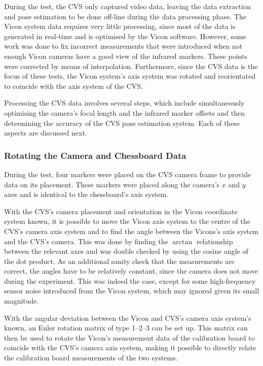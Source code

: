 During the test, the CVS only captured video data, leaving the data extraction and pose estimation to be done off-line during the data processing phase. The Vicon system data requires very little processing, since most of the data is generated in real-time and is optimised by the Vicon software. However, some work was done to fix incorrect measurements that were introduced when not enough Vicon cameras have a good view of the infrared markers. These points were corrected by means of interpolation. Furthermore, since the CVS data is the focus of these tests, the Vicon system's axis system was rotated and reorientated to coincide with the axis system of the CVS.

Processing the CVS data involves several steps, which include simultaneously optimising the camera's focal length and the infrared marker offsets and then determining the accuracy of the CVS pose estimation system. Each of these aspects are discussed next.

\subsubsection{Rotating the Camera and Chessboard Data}
\label{sec:rotate-axes}

During the test, four markers were placed on the CVS camera frame to provide data on its placement. These markers were placed along the camera's $x$ and $y$ axes and is identical to the chessboard's axis system. 

With the CVS's camera placement and orientation in the Vicon coordinate system known, it is possible to move the Vicon axis system to the centre of the CVS's camera axis system and to find the angle between the Vicons's axis system and the CVS's camera. This was done by finding the $\arctan$ relationship between the relevant axes and was double checked by using the cosine angle of the dot product. As an additional sanity check that the measurements are correct, the angles have to be relatively constant, since the camera does not move during the experiment. This was indeed the case, except for some high-frequency sensor noise introduced from the Vicon system, which may ignored given its small magnitude. 

With the angular deviation between the Vicon and CVS's camera axis system's known, an Euler rotation matrix of type 1--2--3 can be set up. This matrix can then be used to rotate the Vicon's measurement data of the calibration board to coincide with the CVS's camera axis system, making it possible to directly relate the calibration board measurements of the two systems. 

